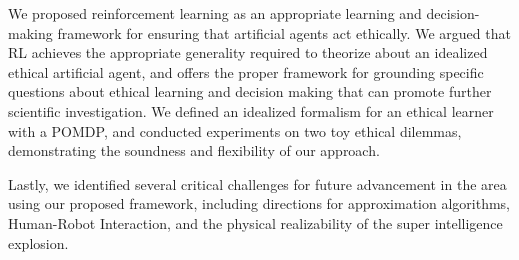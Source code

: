 \documentclass[11pt]{article}
\begin{document}
We proposed reinforcement learning as an appropriate learning and decision-making framework for ensuring that artificial agents act ethically. We argued that RL achieves the appropriate generality required to theorize about an idealized ethical artificial agent, and offers the proper framework for grounding specific questions about ethical learning and decision making that can promote further scientific investigation. We defined an idealized formalism for an ethical learner with a POMDP, and conducted experiments on two toy ethical dilemmas, demonstrating the soundness and flexibility of our approach.

Lastly, we identified several critical challenges for future advancement in the area using our proposed framework, including directions for approximation algorithms, Human-Robot Interaction, and the physical realizability of the super intelligence explosion.


%
%
%
%
%





\end{document}
